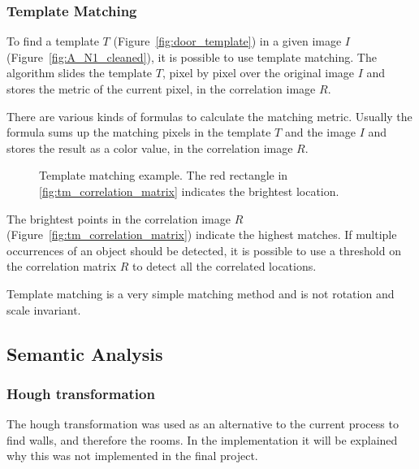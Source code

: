 \subsubsection{Template Matching}
\label{sub:TemplateMatching}
To find a template $T$ (Figure~\ref{fig:door_template}) in a given image $I$ (Figure~\ref{fig:A_N1_cleaned}), it is possible to use template matching. The algorithm slides the template $T$, pixel by pixel over the original image $I$ and stores the metric of the current pixel, in the correlation image $R$.

There are various kinds of formulas to calculate the matching metric. Usually the formula sums up the matching pixels in the template $T$ and the image $I$ and stores the result as a color value, in the correlation image $R$.

\begin{figure}[h!]
	\centering
	\hfill
	\hfill
	\caption{Template matching example. The red rectangle in \ref{fig:tm_correlation_matrix} indicates the brightest location.}
	\label{fig:TemplateMatchingExample}
\end{figure}


The brightest points in the correlation image $R$ (Figure~\ref{fig:tm_correlation_matrix})  indicate the highest matches. If multiple occurrences of an object should be detected, it is possible to use a threshold on the correlation matrix $R$ to detect all the correlated locations.

Template matching is a very simple matching method and is not rotation and scale invariant.



 
\subsection{Semantic Analysis}
\subsubsection{Hough transformation}
\label{subsubsec:Hough transformation}
The hough transformation was used as an alternative to the current process to find walls, and therefore the rooms. In the implementation it will be explained why this was not implemented in the final project.

